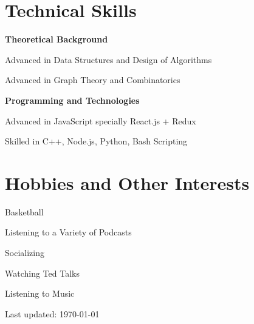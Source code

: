 \documentclass[letterpaper]{article}
\def\footerlink{}
\renewenvironment{itemize}{
  \begin{list}{}{
    \setlength{\leftmargin}{1.5em}
  }
}{
  \end{list}
}
\begin{document}
\section*{Technical Skills}
    \begin{itemize}
        \item \textbf{Theoretical Background}
            \begin{itemize}
                \item Advanced in Data Structures and Design of Algorithms
                \item Advanced in Graph Theory and Combinatorics
            \end{itemize}
        \item \textbf{Programming and Technologies}
            \begin{itemize}
                \item Advanced in JavaScript specially React.js + Redux
                \item Skilled in C++, Node.js, Python, Bash Scripting
            \end{itemize}
    \end{itemize}
\section*{Hobbies and Other Interests}
    \begin{itemize}
        \item Basketball
        \item Listening to a Variety of Podcasts
        \item Socializing
        \item Watching Ted Talks
        \item Listening to Music
    \end{itemize}

\bigskip

\begin{center}
  \begin{footnotesize}
    Last updated: \today \\
    \href{\footerlink}{\texttt{\footerlink}}
  \end{footnotesize}
\end{center}
\end{document}
